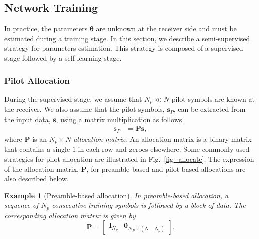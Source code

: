\documentclass{article}
\newtheorem{example}{Example}
\begin{document}
%

\subsection{Network Training}
\label{sec_nettraining}

In practice, the parameters $\boldsymbol \theta$ are unknown at the receiver side and must be estimated during a training stage. In this section, we describe a semi-supervised strategy for parameters estimation. This strategy is composed of a supervised stage followed by a self learning stage.

\subsubsection{Pilot Allocation}

During the supervised stage, we assume that $N_p\ll N$ pilot symbols are known at the receiver. We also assume that the pilot symbols, $\mathbf{s}_{P}$, can be extracted from the input data, $\mathbf{s}$, using a matrix multiplication as follows
\begin{align}
\mathbf{s}_{P}&=\mathbf{P}\mathbf{s},
\end{align}
where $\mathbf{P}$ is an $N_p\times N$ \emph{allocation matrix}. An allocation matrix is a binary matrix that contains a single $1$ in each row and zeroes elsewhere. Some commonly used strategies for pilot allocation are illustrated in Fig.~\ref{fig_allocate}. The expression of the allocation matrix, $\mathbf{P}$, for preamble-based and pilot-based allocations are also described below.

\begin{example}[Preamble-based allocation]
In preamble-based allocation, a sequence of $N_p$ consecutive training symbols is followed by a block of data. The corresponding allocation matrix is given by 
$$\mathbf{P}=\begin{bmatrix}
\mathbf{I}_{N_p} & \mathbf{0}_{N_P\times (N-N_p)}
\end{bmatrix}.$$
\end{example}
\end{document}
